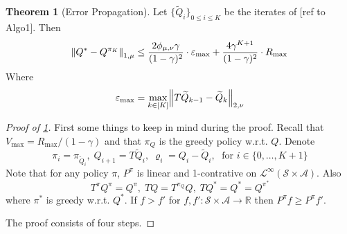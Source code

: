 \documentclass{article}
\theoremstyle{definition}
\newtheorem{thm}{Theorem}
\newcommand{\bb}{\mathbb}
\newcommand{\Cal}{\mathcal}
\newcommand{\R}{\bb{R}}
\newcommand{\wt}{\widetilde}
\begin{document}
\begin{thm}[Error Propagation]
  Let $\{\wt{Q}_i\}_{0\leq i\leq K}$ be the iterates of [ref to Algo1].
  Then
  \begin{equation*}
    \norm{Q^* - Q^{\pi_K}}_{1, \mu}
    \leq \frac{2 \phi_{\mu,\nu} \gamma}{(1-\gamma)^2} \cdot \varepsilon_{\max}
    + \frac{4 \gamma^{K+1}}{(1-\gamma)^2} \cdot R_{\max}
  \end{equation*}
  Where
  \[ \varepsilon_{\max}
  = \max_{k \in [K]} \norm{T\wt{Q}_{k-1} - \wt{Q}_k}_{2,\nu} \]
  \label{thm:errorpropagation}
\end{thm}

\begin{proof}[Proof of \cref{thm:errorpropagation}] 
  First some things to keep in mind during the proof.
  Recall that $V_{\max} = R_{\max} / (1 - \gamma)$ and that
  $\pi_Q$ is the greedy policy w.r.t. $Q$.
  Denote 
  \[ \pi_i = \pi_{\wt{Q}_i},
    \; Q_{i+1} = T \wt{Q}_{i},
  \; \varrho_{i} = Q_{i} - \wt{Q}_{i},
\; \mbox{ for } i \in \{0,\dots,K+1\} \]
  Note that for any policy $\pi$,
  $P^{\pi}$ is linear and 1-contrative on
  $\Cal{L}^\infty(\Cal{S} \times \Cal{A})$. %
  Also \[ T^{\pi} Q^{\pi} = Q^{\pi}, \;
    T Q = T^{\pi_Q} Q, \;
  T Q^* = Q^* = Q^{\pi^*} \]
  where $\pi^*$ is greedy w.r.t. $Q^*$. 
  If $f > f'$ for $f,f':\Cal{S}\times \Cal{A} \to \R$
  then $P^{\pi} f \geq P^{\pi} f'$. %
  
  The proof consists of four steps.


\end{proof}
\end{document}
